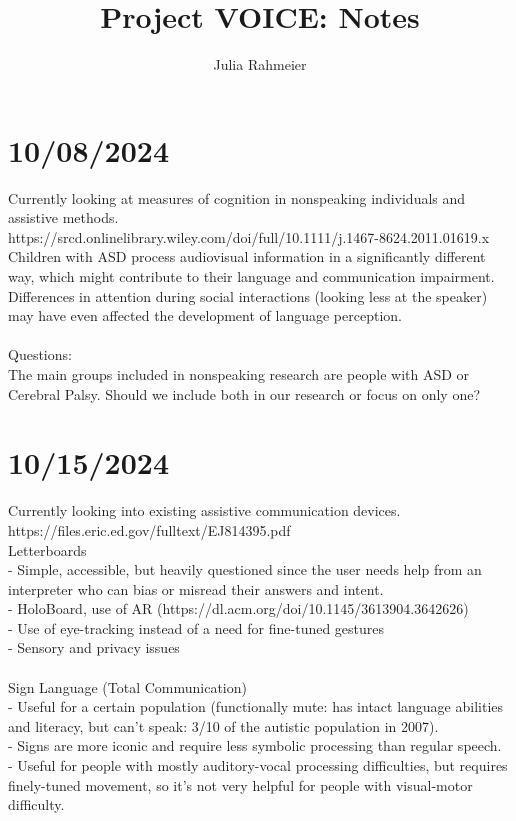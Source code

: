 \documentclass{article}
\author{Julia Rahmeier}
\title{Project VOICE: Notes}
\begin{document}
	
	\maketitle
	
	\section{10/08/2024}
	Currently looking at measures of cognition in nonspeaking individuals and assistive methods. \\
	
	https://srcd.onlinelibrary.wiley.com/doi/full/10.1111/j.1467-8624.2011.01619.x \\
	
	Children with ASD process audiovisual information in a significantly different way, which might contribute to their language and communication impairment.
	Differences in attention during social interactions (looking less at the speaker) may have even affected the development of language perception. \\\\
	Questions: \\
	The main groups included in nonspeaking research are people with ASD or Cerebral Palsy. Should we include both in our research or focus on only one?
	
	\section{10/15/2024}
	Currently looking into existing assistive communication devices. \\
	https://files.eric.ed.gov/fulltext/EJ814395.pdf \\
	
	Letterboards \\
	- Simple, accessible, but heavily questioned since the user needs help from an interpreter who can bias or misread their answers and intent. \\
	- HoloBoard, use of AR (https://dl.acm.org/doi/10.1145/3613904.3642626)\\
    - Use of eye-tracking instead of a need for fine-tuned gestures \\
	- Sensory and privacy issues \\
	\\
	
	Sign Language (Total Communication) \\
	- Useful for a certain population (functionally mute: has intact language abilities and literacy, but can’t speak:  3/10 of the autistic population in 2007). \\
	- Signs are more iconic and require less symbolic processing than regular speech. \\
	- Useful for people with mostly auditory-vocal processing difficulties, but requires finely-tuned movement, so it’s not very helpful for people with visual-motor difficulty. \\
	\\
	
\end{document}
